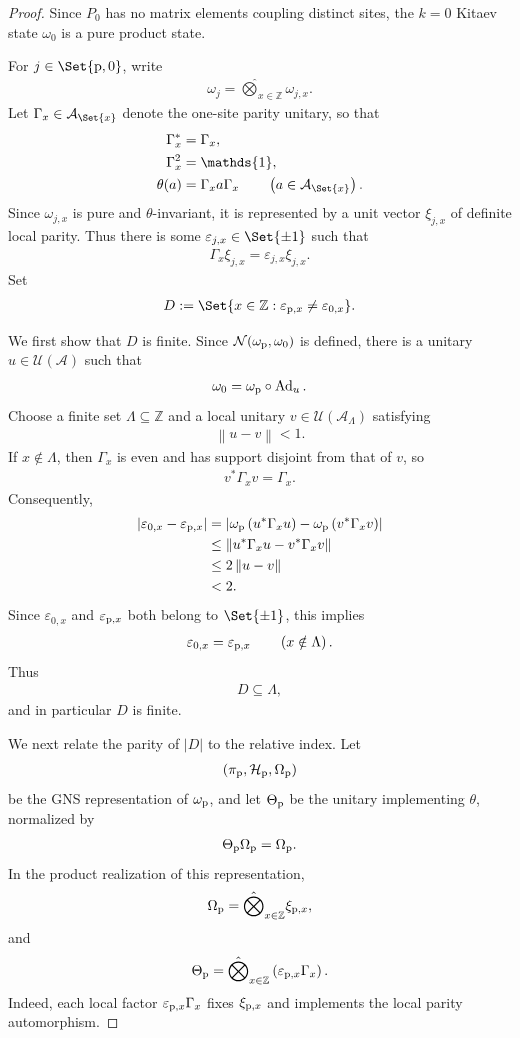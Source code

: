 \documentclass[a4paper,10pt]{article}
\numberwithin{equation}{section}
\theoremstyle{plain}
\theoremstyle{plain}
\theoremstyle{plain}
\theoremstyle{plain}
\theoremstyle{plain}
\theoremstyle{remark}
\theoremstyle{definition}
\newcommand{\ZZ}{\mathbb{Z}}
\newcommand{\calA}{\mathcal{A}}
\newcommand{\calN}{\mathcal{N}}
\newcommand{\calU}{\mathcal{U}}
\newcommand{\calH}{\mathcal{H}}
\newcommand\norm[1]{\left\lVert#1\right\rVert}
\newcommand{\Ad}[1]{\operatorname{Ad}_{#1}}
\newcommand{\ve}{\varepsilon}
\newcommand{\Id}{\mathds{1}}
\newcommand{\eq}[1]{\begin{align*}#1\end{align*}}
\newcommand{\br}[1]{\left(#1\right)}
\begin{document}
\begin{proof}
Since $P_0$ has no matrix elements coupling distinct sites, the $k=0$
Kitaev state $\omega_0$ is a pure product state.

For $j\in\Set{{\rm p},0}$, write
\eq{
\omega_j
=
\hat{\bigotimes}_{x\in\ZZ}
\omega_{j,x}.
}
Let $\Gamma_x\in\calA_{\Set{x}}$ denote the one-site parity unitary, so
that
\eq{
\Gamma_x^\ast
&=
\Gamma_x,\\
\Gamma_x^2
&=
\Id,\\
\theta(a)
&=
\Gamma_xa\Gamma_x
\qquad
\br{
a\in\calA_{\Set{x}}
}.
}
Since $\omega_{j,x}$ is pure and $\theta$-invariant, it is represented by
a unit vector $\xi_{j,x}$ of definite local parity. Thus there is some
$\ve_{j,x}\in\Set{\pm1}$ such that
\eq{
\Gamma_x\xi_{j,x}
=
\ve_{j,x}\xi_{j,x}.
}
Set
\eq{
D
:=
\Set{
x\in\ZZ:
\ve_{{\rm p},x}\neq\ve_{0,x}
}.
}

We first show that $D$ is finite. Since
$\calN(\omega_{\rm p},\omega_0)$ is defined, there is a unitary
$u\in\calU(\calA)$ such that
\eq{
\omega_0
=
\omega_{\rm p}\circ\Ad{u}.
}
Choose a finite set $\Lambda\subseteq\ZZ$ and a local unitary
$v\in\calU(\calA_\Lambda)$ satisfying
\eq{
\norm{u-v}
<
1.
}
If $x\notin\Lambda$, then $\Gamma_x$ is even and has support disjoint
from that of $v$, so
\eq{
v^\ast\Gamma_xv
=
\Gamma_x.
}
Consequently,
\eq{
\left|
\ve_{0,x}-\ve_{{\rm p},x}
\right|
&=
\left|
\omega_{\rm p}
\br{
u^\ast\Gamma_xu
}
-
\omega_{\rm p}
\br{
v^\ast\Gamma_xv
}
\right|\\
&\leq
\norm{
u^\ast\Gamma_xu
-
v^\ast\Gamma_xv
}\\
&\leq
2\norm{u-v}\\
&<
2.
}
Since $\ve_{0,x}$ and $\ve_{{\rm p},x}$ both belong to $\Set{\pm1}$, this
implies
\eq{
\ve_{0,x}
=
\ve_{{\rm p},x}
\qquad
\br{
x\notin\Lambda
}.
}
Thus
\eq{
D
\subseteq
\Lambda,
}
and in particular $D$ is finite.

We next relate the parity of $\lvert D\rvert$ to the relative index.
Let
\eq{
\br{
\pi_{\rm p},
\calH_{\rm p},
\Omega_{\rm p}
}
}
be the GNS representation of $\omega_{\rm p}$, and let
$\Theta_{\rm p}$ be the unitary implementing $\theta$, normalized by
\eq{
\Theta_{\rm p}\Omega_{\rm p}
=
\Omega_{\rm p}.
}
In the product realization of this representation,
\eq{
\Omega_{\rm p}
=
\hat{\bigotimes}_{x\in\ZZ}
\xi_{{\rm p},x},
}
and
\eq{
\Theta_{\rm p}
=
\hat{\bigotimes}_{x\in\ZZ}
\br{
\ve_{{\rm p},x}\Gamma_x
}.
}
Indeed, each local factor $\ve_{{\rm p},x}\Gamma_x$ fixes
$\xi_{{\rm p},x}$ and implements the local parity automorphism.


\end{proof}
\end{document}
